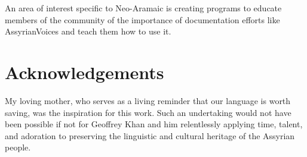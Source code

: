\documentclass[letterpaper]{article} %
\begin{document}
An area of interest specific to Neo-Aramaic is creating programs to educate members of the community of the importance of documentation efforts like AssyrianVoices and teach them how to use it.

\section{Acknowledgements}
My loving mother, who serves as a living reminder that our language is worth saving, was the inspiration for this work. Such an undertaking would not have been possible if not for Geoffrey Khan and him relentlessly applying time, talent, and adoration to preserving the linguistic and cultural heritage of the Assyrian people.


\end{document}

